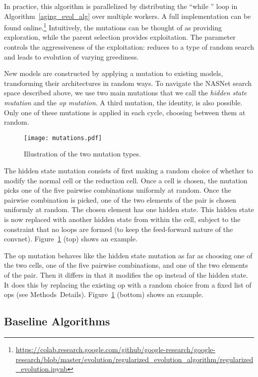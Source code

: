 \documentclass[letterpaper]{article} \usepackage{aaai19}  \usepackage{times}  \usepackage{helvet}  \usepackage{courier}  \usepackage{graphicx}  \frenchspacing
\begin{document}
In practice, this algorithm is parallelized by distributing the ``{while }'' loop in Algorithm~\ref{aging_evol_alg} over multiple workers. A full implementation can be found online.\footnote{\url{https://colab.research.google.com/github/google-research/google-research/blob/master/evolution/regularized_evolution_algorithm/regularized_evolution.ipynb}} Intuitively, the mutations can be thought of as providing exploration, while the parent selection provides exploitation. The parameter  controls the aggressiveness of the exploitation:  reduces to a type of random search and  leads to evolution of varying greediness.

New models are constructed by applying a mutation to existing models, transforming their architectures in random ways. To navigate the NASNet search space described above, we use two main mutations that we call the \textit{hidden state mutation} and the \textit{op mutation}. A third mutation, the identity, is also possible. Only one of these mutations is applied in each cycle, choosing between them at random.

\begin{figure}[ht]
\centering
\texttt{[image: mutations.pdf]}
\caption{Illustration of the two mutation types.}
\label{mutations_fig}
\end{figure}

The hidden state mutation consists of first making a random choice of whether to modify the normal cell or the reduction cell. Once a cell is chosen, the mutation picks one of the five pairwise combinations uniformly at random. Once the pairwise combination is picked, one of the two elements of the pair is chosen uniformly at random. The chosen element has one hidden state. This hidden state is now replaced with another hidden state from within the cell, subject to the constraint that no loops are formed (to keep the feed-forward nature of the convnet). Figure~\ref{mutations_fig} (top) shows an example.

The op mutation behaves like the hidden state mutation as far as choosing one of the two cells, one of the five pairwise combinations, and one of the two elements of the pair. Then it differs in that it modifies the op instead of the hidden state. It does this by replacing the existing op with a random choice from a fixed list of ops (see Methods~Details). Figure~\ref{mutations_fig} (bottom) shows an example.


\subsection{Baseline Algorithms}
\end{document}
